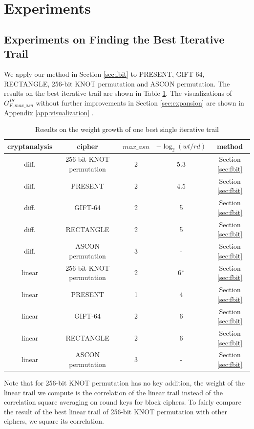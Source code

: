 \section{Experiments\label{sec:experiment}}

\subsection{Experiments on Finding the Best Iterative Trail}

We apply our method in Section \ref{sec:fbit} to PRESENT, GIFT-64, RECTANGLE, 256-bit KNOT permutation and ASCON permutation. The results on the best iterative trail are shown in Table \ref{tab:it}. The visualizations of $G^{IS}_{F,max\_asn}$ without further improvements in Section \ref{sec:expansion} are shown in Appendix \ref{app:visualization} .

\begin{table}
	\caption{Results on the weight growth of one best single iterative trail}\label{tab:it}
	\centering
	\begin{tabular}{|c|c|c|c|c|}
		\hline
		cryptanalysis & cipher & $max\_asn$ & $-\log_2(wt/rd)$ & method\\
		\hline
		diff. & 256-bit KNOT permutation & 2 & 5.3 & Section \ref{sec:fbit}\\
		\hline
		diff. & PRESENT & 2 & 4.5 & Section \ref{sec:fbit}\\
		\hline
		diff. & GIFT-64 & 2 & 5 & Section \ref{sec:fbit}\\
		\hline
		diff. & RECTANGLE & 2 & 5 & Section \ref{sec:fbit}\\
		\hline
		diff. & ASCON permutation & 3 & - & Section \ref{sec:fbit}\\
		\hline
		linear & 256-bit KNOT permutation & 2 & 6* & Section \ref{sec:fbit}\\
		\hline
		linear & PRESENT & 1 & 4 & Section \ref{sec:fbit}\\
		\hline
		linear & GIFT-64 & 2 & 6 & Section \ref{sec:fbit}\\
		\hline
		linear & RECTANGLE & 2 & 6 & Section \ref{sec:fbit}\\
		\hline
		linear & ASCON permutation & 3 & - & Section \ref{sec:fbit}\\
		\hline
	\end{tabular}
\end{table}

Note that for 256-bit KNOT permutation has no key addition, the weight of the linear trail we compute is the correlation of the linear trail instead of the correlation square averaging on round keys for block ciphers. To fairly compare the result of the best linear trail of 256-bit KNOT permutation with other ciphers, we square its correlation.

